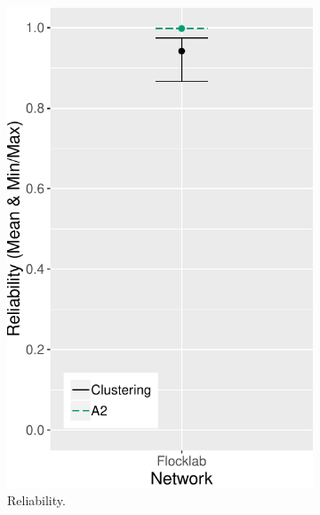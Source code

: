 \begin{figure}[bt]
    \centering
    \begin{subfigure}{0.24\textwidth}
        \centering
        \includegraphics[width=\textwidth, keepaspectratio]{figure/Results/ChaosComparison/Flocklab/FlocklabComparison_Reliability.pdf}
        \caption{Reliability.}
        \label{subfig:flocklab-reliability}
    \end{subfigure}
    \begin{subfigure}{0.24\textwidth}
        \centering

\end{subfigure}
\end{figure}
